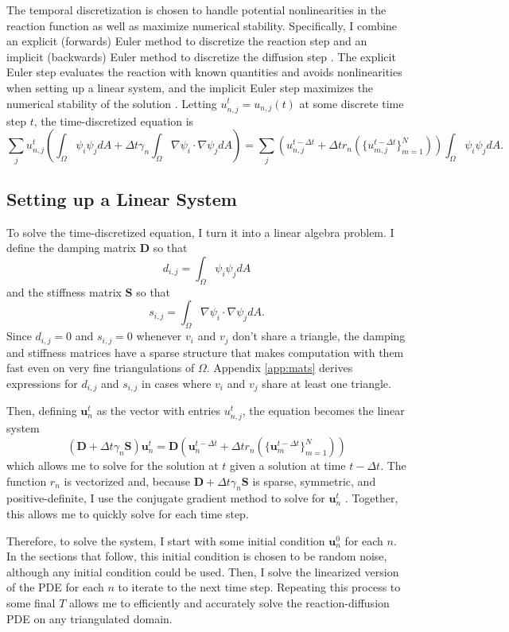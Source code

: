 The temporal discretization is chosen to handle potential nonlinearities in the reaction function as well as maximize numerical stability. Specifically, I combine an explicit (forwards) Euler method to discretize the reaction step and an implicit (backwards) Euler method to discretize the diffusion step \parencite{sellami2020accelerating}. The explicit Euler step evaluates the reaction with known quantities and avoids nonlinearities when setting up a linear system, and the implicit Euler step maximizes the numerical stability of the solution \parencite{folland2020introduction}. Letting $u_{n, j}^t = u_{n, j}(t)$ at some discrete time step $t$, the time-discretized equation is
\[
    \sum_j u_{n, j}^t \left(\int_\Omega \psi_i \psi_j dA + \Delta t \gamma_n \int_\Omega \nabla \psi_i \cdot \nabla \psi_j dA\right) = \sum_j \left(u_{n, j}^{t - \Delta t} + \Delta t r_n \left(\{u_{m, j}^{t - \Delta t}\}_{m = 1}^N\right)\right) \int_\Omega \psi_i \psi_j dA.
\]


\subsection{Setting up a Linear System}

To solve the time-discretized equation, I turn it into a linear algebra problem. I define the damping matrix $\mathbf{D}$ so that
\[
    d_{i, j} = \int_\Omega \psi_i \psi_j dA
\]
and the stiffness matrix $\mathbf{S}$ so that
\[
    s_{i, j} = \int_\Omega \nabla \psi_i \cdot \nabla \psi_j dA.
\]
Since $d_{i, j} = 0$ and $s_{i, j} = 0$ whenever $v_i$ and $v_j$ don't share a triangle, the damping and stiffness matrices have a sparse structure that makes computation with them fast even on very fine triangulations of $\Omega$. Appendix \ref{app:mats} derives expressions for $d_{i, j}$ and $s_{i, j}$ in cases where $v_i$ and $v_j$ share at least one triangle.

Then, defining $\mathbf{u}_n^t$ as the vector with entries $u_{n, j}^t$, the equation becomes the linear system
\[
    \left(\mathbf{D} + \Delta t \gamma_n \mathbf{S}\right) \mathbf{u}_n^t = \mathbf{D} \left(\mathbf{u}_n^{t - \Delta t} + \Delta t r_n \left(\{\mathbf{u}_m^{t - \Delta t}\}_{m = 1}^N\right)\right)
\]
which allows me to solve for the solution at $t$ given a solution at time $t - \Delta t$. The function $r_n$ is vectorized and, because $\mathbf{D} + \Delta t \gamma_n \mathbf{S}$ is sparse, symmetric, and positive-definite, I use the conjugate gradient method to solve for $\mathbf{u}_n^t$ \parencite{nazareth2009conjugate}. Together, this allows me to quickly solve for each time step.

Therefore, to solve the system, I start with some initial condition $\mathbf{u}_n^0$ for each $n$. In the sections that follow, this initial condition is chosen to be random noise, although any initial condition could be used. Then, I solve the linearized version of the PDE for each $n$ to iterate to the next time step. Repeating this process to some final $T$ allows me to efficiently and accurately solve the reaction-diffusion PDE on any triangulated domain.

